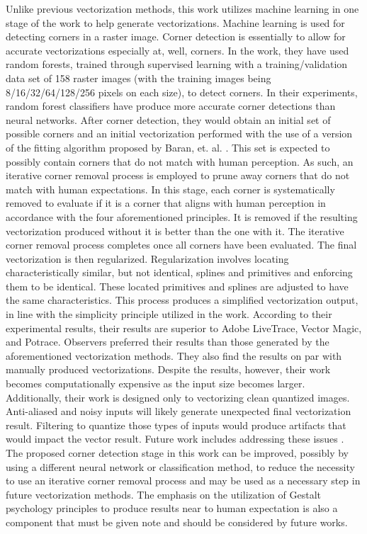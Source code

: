 Unlike previous vectorization methods, this work utilizes machine learning in one stage of the work to help generate vectorizations. Machine learning is used for detecting corners in a raster image. Corner detection is essentially to allow for accurate vectorizations especially at, well, corners. In the work, they have used random forests, trained through supervised learning with a training/validation data set of 158 raster images (with the training images being 8/16/32/64/128/256 pixels on each size), to detect corners. In their experiments, random forest classifiers have produce more accurate corner detections than neural networks. After corner detection, they would obtain an initial set of possible corners and an initial vectorization performed with the use of a version of the fitting algorithm proposed by Baran, et. al. \cite{sketchingclothoidsplines}. This set is expected to possibly contain corners that do not match with human perception. As such, an iterative corner removal process is employed to prune away corners that do not match with human expectations. In this stage, each corner is systematically removed to evaluate if it is a corner that aligns with human perception in accordance with the four aforementioned principles. It is removed if the resulting vectorization produced without it is better than the one with it. The iterative corner removal process completes once all corners have been evaluated. The final vectorization is then regularized. Regularization involves locating characteristically similar, but not identical, splines and primitives and enforcing them to be identical. These located primitives and splines are adjusted to have the same characteristics. This process produces a simplified vectorization output, in line with the simplicity principle utilized in the work. According to their experimental results, their results are superior to Adobe LiveTrace, Vector Magic, and Potrace. Observers preferred their results than those generated by the aforementioned vectorization methods. They also find the results on par with manually produced vectorizations. Despite the results, however, their work becomes computationally expensive as the input size becomes larger. Additionally, their work is designed only to vectorizing clean quantized images. Anti-aliased and noisy inputs will likely generate unexpected final vectorization result. Filtering to quantize those types of inputs would produce artifacts that would impact the vector result. Future work includes addressing these issues \cite{hoshyari2018perceptiondriven}. The proposed corner detection stage in this work can be improved, possibly by using a different neural network or classification method, to reduce the necessity to use an iterative corner removal process and may be used as a necessary step in future vectorization methods. The emphasis on the utilization of Gestalt psychology principles to produce results near to human expectation is also a component that must be given note and should be considered by future works.


